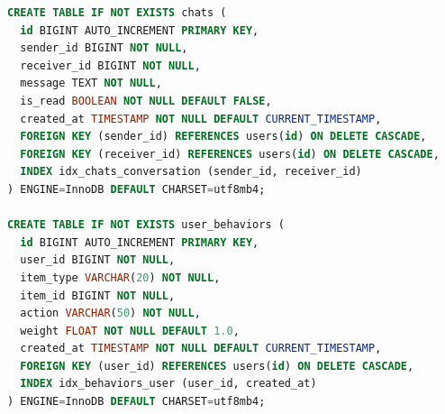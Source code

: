 \begin{lstlisting}[language=SQL, caption={01_schema.sql DDL Script}]
CREATE TABLE IF NOT EXISTS chats (
  id BIGINT AUTO_INCREMENT PRIMARY KEY,
  sender_id BIGINT NOT NULL,
  receiver_id BIGINT NOT NULL,
  message TEXT NOT NULL,
  is_read BOOLEAN NOT NULL DEFAULT FALSE,
  created_at TIMESTAMP NOT NULL DEFAULT CURRENT_TIMESTAMP,
  FOREIGN KEY (sender_id) REFERENCES users(id) ON DELETE CASCADE,
  FOREIGN KEY (receiver_id) REFERENCES users(id) ON DELETE CASCADE,
  INDEX idx_chats_conversation (sender_id, receiver_id)
) ENGINE=InnoDB DEFAULT CHARSET=utf8mb4;

CREATE TABLE IF NOT EXISTS user_behaviors (
  id BIGINT AUTO_INCREMENT PRIMARY KEY,
  user_id BIGINT NOT NULL,
  item_type VARCHAR(20) NOT NULL,
  item_id BIGINT NOT NULL,
  action VARCHAR(50) NOT NULL,
  weight FLOAT NOT NULL DEFAULT 1.0,
  created_at TIMESTAMP NOT NULL DEFAULT CURRENT_TIMESTAMP,
  FOREIGN KEY (user_id) REFERENCES users(id) ON DELETE CASCADE,
  INDEX idx_behaviors_user (user_id, created_at)
) ENGINE=InnoDB DEFAULT CHARSET=utf8mb4;
\end{lstlisting}
